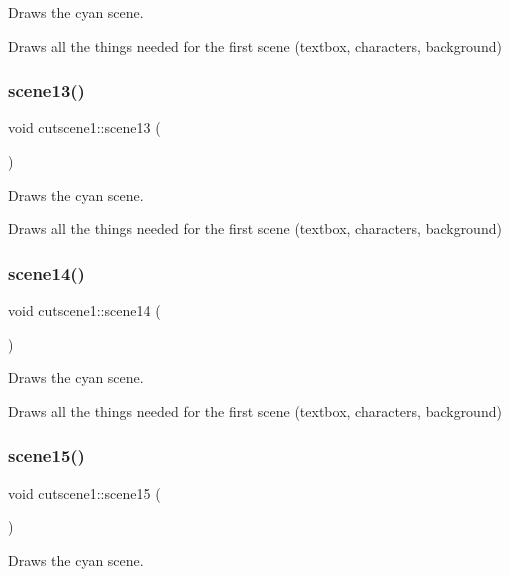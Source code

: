 Draws the cyan scene. 

Draws all the things needed for the first scene (textbox, characters, background) \mbox{\label{classcutscene1_a70656ea0e35919324bff0a85f81a5a92}} 
\subsubsection{\texorpdfstring{scene13()}{scene13()}}
{\footnotesize\ttfamily void cutscene1\+::scene13 (\begin{DoxyParamCaption}{ }\end{DoxyParamCaption})}



Draws the cyan scene. 

Draws all the things needed for the first scene (textbox, characters, background) \mbox{\label{classcutscene1_ad361d93d7c2c69c96bece8449221ac41}} 
\subsubsection{\texorpdfstring{scene14()}{scene14()}}
{\footnotesize\ttfamily void cutscene1\+::scene14 (\begin{DoxyParamCaption}{ }\end{DoxyParamCaption})}



Draws the cyan scene. 

Draws all the things needed for the first scene (textbox, characters, background) \mbox{\label{classcutscene1_a2e175a494e93ec627d314f6372a6578c}} 
\subsubsection{\texorpdfstring{scene15()}{scene15()}}
{\footnotesize\ttfamily void cutscene1\+::scene15 (\begin{DoxyParamCaption}{ }\end{DoxyParamCaption})}



Draws the cyan scene. 

